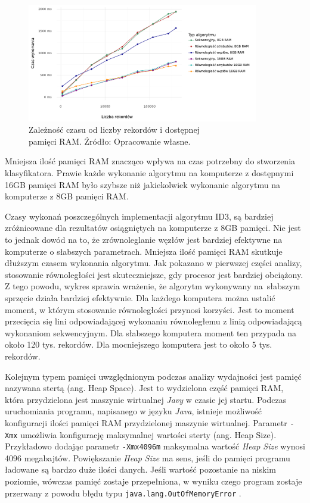 \documentclass[12pt]{article}
\begin{document}
\begin{figure}[H]
    \centering
	\includegraphics[width=0.9\textwidth]{analysis-ram.pdf}
    \caption{Zależność czasu od liczby rekordów i dostępnej\\pamięci RAM. Źródło: Opracowanie własne.}
    \label{fig:analysis-ram}
\end{figure}

Mniejsza ilość pamięci RAM znacząco wpływa na czas potrzebny do stworzenia klasyfikatora.
Prawie każde wykonanie algorytmu na komputerze z dostępnymi 16GB pamięci RAM było szybsze niż
jakiekolwiek wykonanie algorytmu na komputerze z 8GB pamięci RAM.

Czasy wykonań poszczególnych implementacji algorytmu ID3, są bardziej zróżnicowane dla rezultatów
osiągniętych na komputerze z 8GB pamięci.
Nie jest to jednak dowód na to, że zrównoleglanie węzłów jest bardziej efektywne
na komputerze o słabszych parametrach. Mniejsza ilość pamięci RAM skutkuje dłuższym
czasem wykonania algorytmu. Jak pokazano w pierwszej części analizy, stosowanie równoległości jest skuteczniejsze,
gdy procesor jest bardziej obciążony. Z tego powodu, wykres sprawia wrażenie, że algorytm wykonywany na~słabszym
sprzęcie działa bardziej efektywnie.
Dla każdego komputera można ustalić moment, w którym stosowanie równoległości przynosi korzyści. Jest to moment
przecięcia się lini odpowiadającej wykonaniu równoległemu z linią odpowiadającą wykonaniom sekwencyjnym.
Dla słabszego komputera moment ten przypada na około 120 tys. rekordów. Dla mocniejszego komputera
jest to około 5 tys. rekordów.

Kolejnym typem pamięci uwzględnionym podczas analizy wydajności jest pamięć nazywana stertą (ang. Heap Space). Jest to wydzielona
część pamięci RAM, która przydzielona jest maszynie wirtualnej \textit{Javy} w czasie jej startu.
Podczas uruchomiania programu, napisanego w języku \textit{Java}, istnieje możliwość konfiguracji ilości
pamięci RAM przydzielonej maszynie wirtualnej. Parametr \verb|-Xmx| umożliwia konfigurację maksymalnej
wartości sterty (ang. Heap Size). Przykładowo dodając parametr \verb|-Xmx4096m|
maksymalna wartość \textit{Heap Size} wynosi 4096 megabajtów. Powiększanie \textit{Heap Size} ma sens, jeśli do pamięci programu
ładowane są bardzo duże ilości danych. Jeśli wartość pozostanie na niskim poziomie, wówczas pamięć zostaje przepełniona, w wyniku czego
program zostaje przerwany z powodu błędu typu \verb|java.lang.OutOfMemoryError| \cite{java-memeory-management}.
\end{document}
